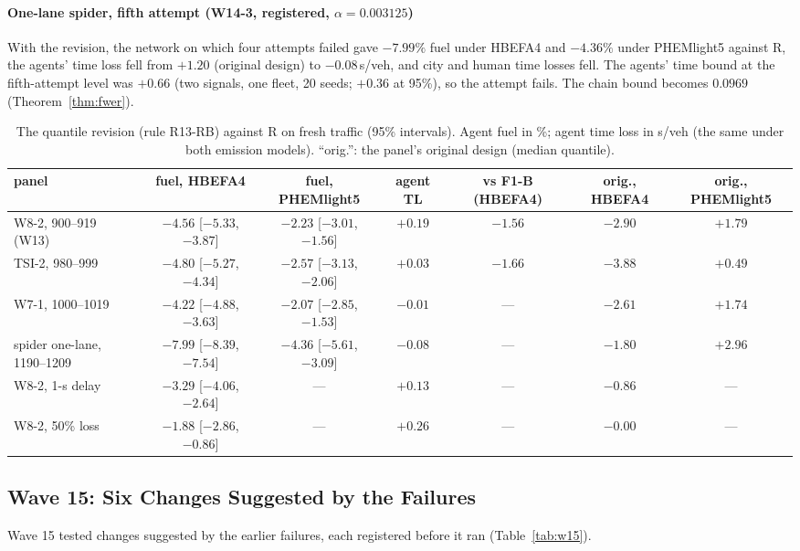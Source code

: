 \paragraph{One-lane spider, fifth attempt (W14-3, registered, $\alpha=0.003125$)} With the revision, the network on which four attempts
failed gave $-7.99\%$ fuel under HBEFA4 and $-4.36\%$ under PHEMlight5 against R, the agents' time loss fell from $+1.20$ (original
design) to $-0.08$\,s/veh, and city and human time losses fell. The agents' time bound at the fifth-attempt level was $+0.66$ (two signals,
one fleet, 20 seeds; $+0.36$ at 95\%), so the attempt fails. The chain bound becomes $0.0969$ (Theorem~\ref{thm:fwer}).
\begin{table}[t]\centering\scriptsize\setlength{\tabcolsep}{2.5pt}
\caption{The quantile revision (rule R13-RB) against R on fresh traffic (95\% intervals). Agent fuel in \%; agent time loss in s/veh (the
same under both emission models). ``orig.'': the panel's original design (median quantile).}\label{tab:w14}
\begin{tabular}{@{}lcccccc@{}}\toprule
panel & fuel, HBEFA4 & fuel, PHEMlight5 & agent TL & vs F1-B (HBEFA4) & orig., HBEFA4 & orig., PHEMlight5\\\midrule
W8-2, 900--919 (W13) & $-4.56$ [$-5.33$, $-3.87$] & $-2.23$ [$-3.01$, $-1.56$] & $+0.19$ & $-1.56$ & $-2.90$ & $+1.79$\\
TSI-2, 980--999 & $-4.80$ [$-5.27$, $-4.34$] & $-2.57$ [$-3.13$, $-2.06$] & $+0.03$ & $-1.66$ & $-3.88$ & $+0.49$\\
W7-1, 1000--1019 & $-4.22$ [$-4.88$, $-3.63$] & $-2.07$ [$-2.85$, $-1.53$] & $-0.01$ & --- & $-2.61$ & $+1.74$\\
spider one-lane, 1190--1209 & $-7.99$ [$-8.39$, $-7.54$] & $-4.36$ [$-5.61$, $-3.09$] & $-0.08$ & --- & $-1.80$ & $+2.96$\\\midrule
W8-2, 1-s delay & $-3.29$ [$-4.06$, $-2.64$] & --- & $+0.13$ & --- & $-0.86$ & ---\\
W8-2, 50\% loss & $-1.88$ [$-2.86$, $-0.86$] & --- & $+0.26$ & --- & $-0.00$ & ---\\\bottomrule
\end{tabular}\end{table}
\subsection{Wave 15: Six Changes Suggested by the Failures}\label{sec:w15}
Wave 15 tested changes suggested by the earlier failures, each registered before it ran (Table~\ref{tab:w15}).
